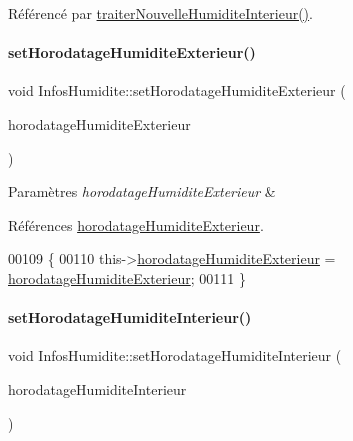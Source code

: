 Référencé par \hyperlink{class_infos_humidite_a0995d68a036f73df3b5a86e5538104bd}{traiter\+Nouvelle\+Humidite\+Interieur()}.

\mbox{\label{class_infos_humidite_acc6231789bd923840dadf4f17310ce69}} 
\paragraph{\texorpdfstring{set\+Horodatage\+Humidite\+Exterieur()}{setHorodatageHumiditeExterieur()}}
{\footnotesize\ttfamily void Infos\+Humidite\+::set\+Horodatage\+Humidite\+Exterieur (\begin{DoxyParamCaption}\item[{const Q\+String}]{horodatage\+Humidite\+Exterieur }\end{DoxyParamCaption})}


\begin{DoxyParams}{Paramètres}
{\em horodatage\+Humidite\+Exterieur} & \\
\hline
\end{DoxyParams}


Références \hyperlink{class_infos_humidite_aa08b4f342e83f8ad437a8272698bb512}{horodatage\+Humidite\+Exterieur}.


\begin{DoxyCode}
00109 \{
00110     this->\hyperlink{class_infos_humidite_aa08b4f342e83f8ad437a8272698bb512}{horodatageHumiditeExterieur} = 
      \hyperlink{class_infos_humidite_aa08b4f342e83f8ad437a8272698bb512}{horodatageHumiditeExterieur};
00111 \}
\end{DoxyCode}
\mbox{\label{class_infos_humidite_a8054d13ab8f57504392756351c376534}} 
\paragraph{\texorpdfstring{set\+Horodatage\+Humidite\+Interieur()}{setHorodatageHumiditeInterieur()}}
{\footnotesize\ttfamily void Infos\+Humidite\+::set\+Horodatage\+Humidite\+Interieur (\begin{DoxyParamCaption}\item[{const Q\+String}]{horodatage\+Humidite\+Interieur }\end{DoxyParamCaption})}



